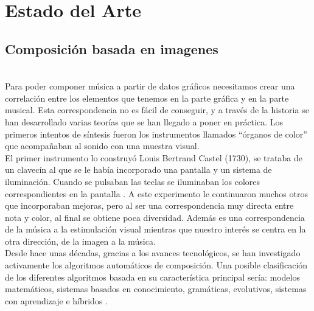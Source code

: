 \section{Estado del Arte}
\label{sec:estadodelarte}



\subsection{Composición basada en imagenes}

\\

Para poder componer música a partir de datos gráficos necesitamos crear una correlación entre los elementos que tenemos en la parte gráfica y en la parte musical. Esta correspondencia no es fácil de conseguir, y a través de la historia se han desarrollado varias teorías que se han llegado a poner en práctica. Los primeros intentos de síntesis fueron los instrumentos llamados ``órganos de color'' que acompañaban al sonido con una muestra visual.\\

El primer instrumento lo construyó Louis Bertrand Castel (1730), se trataba de un clavecín al que se le había incorporado una pantalla y un sistema de iluminación. Cuando se pulsaban las teclas se iluminaban los colores correspondientes en la pantalla \cite{organosColor}. A este experimento le continuaron muchos otros que incorporaban mejoras, pero al ser una correspondencia muy directa entre nota y color, al final se obtiene poca diversidad. Además es una correspondencia de la música a la estimulación visual mientras que nuestro interés se centra en la otra dirección, de la imagen a la música.\\

Desde hace unas décadas, gracias a los avances tecnológicos, se han investigado activamente los algoritmos automáticos de composición. Una posible clasificación de los diferentes algoritmos basada en su característica principal sería: modelos matemáticos, sistemas basados en conocimiento, gramáticas, evolutivos, sistemas con aprendizaje e híbridos \cite{AIMethodsForComposition}.


